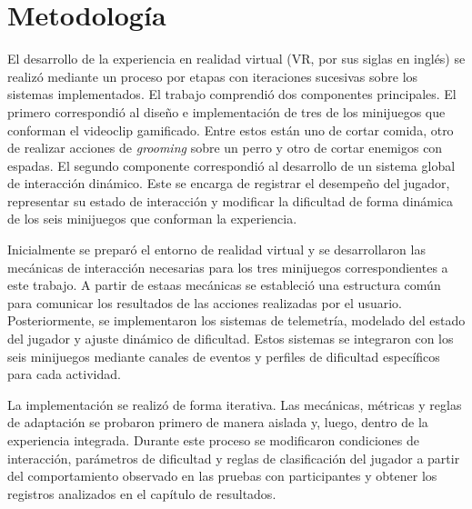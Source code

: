 \chapter{Metodología}
El desarrollo de la experiencia en realidad virtual (VR, por sus siglas 
en inglés) se realizó mediante un proceso por etapas con iteraciones
sucesivas sobre los sistemas implementados. El trabajo comprendió dos 
componentes principales. El primero correspondió al diseño e 
implementación de tres de los minijuegos que conforman el videoclip 
gamificado. Entre estos están uno de cortar comida, otro de realizar
acciones de \textit{grooming} sobre un perro y otro de cortar enemigos
con espadas. El segundo componente correspondió al desarrollo de un 
sistema global de interacción dinámico. Este se encarga de registrar el desempeño del jugador,
representar su estado de interacción y modificar la dificultad de forma dinámica de los 
seis minijuegos que conforman la experiencia. 

Inicialmente se preparó el entorno de realidad virtual y se desarrollaron
las mecánicas de interacción necesarias para los tres minijuegos 
correspondientes a este trabajo. A partir de estaas mecánicas se 
estableció una estructura común para comunicar los resultados de las 
acciones realizadas por el usuario. Posteriormente, se implementaron los
sistemas de telemetría, modelado del estado del jugador y ajuste
dinámico de dificultad. Estos sistemas se integraron con los seis
minijuegos mediante canales de eventos y perfiles de dificultad 
específicos para cada actividad.

La implementación se realizó de forma iterativa. Las mecánicas, métricas
y reglas de adaptación se probaron primero de manera aislada y, luego,
dentro de la experiencia integrada. Durante este proceso se modificaron
condiciones de interacción, parámetros de dificultad y reglas de
clasificación del jugador a partir del comportamiento observado en las
pruebas con participantes y obtener los registros analizados en el
capítulo de resultados.

